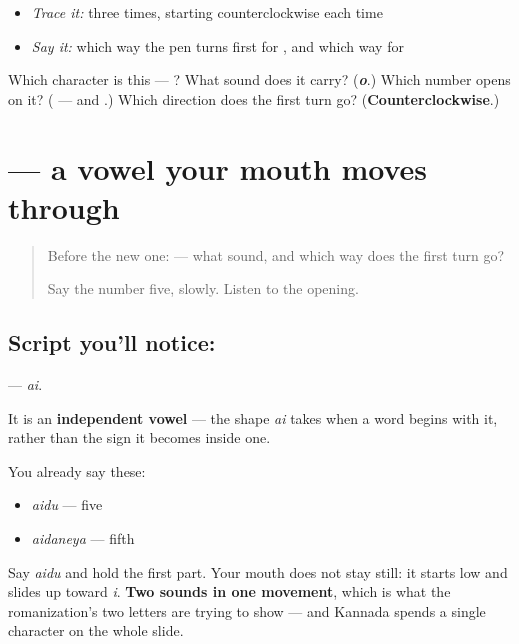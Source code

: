 \begin{itemize}
\raggedright
  \item \emph{Trace it:}  three times, starting counterclockwise each time
  \item \emph{Say it:} which way the pen turns first for , and which way for 
\end{itemize}

\begin{tcolorbox}[breakable,colback=teal!4,colframe=teal!35!black,title={Before you move on}]
Which character is this — ? What sound does it carry? (\emph{\textbf{o}}.) Which number opens on it? (\textbf{} — and \textbf{}.) Which direction does the first turn go? (\textbf{Counterclockwise}.)
\end{tcolorbox}
\section[\texorpdfstring{\kn{ಐ} (ai)}{ಐ (ai)}]{ — a vowel your mouth moves through}

\label{lesson:KA-S159-letter-ai}



\begin{quote}
Before the new one:  — what sound, and which way does the first turn go?

Say the number five, slowly. Listen to the opening.
\end{quote}

\subsection*{Script you'll notice: }
\textbf{} — \emph{ai}.

It is an \textbf{independent vowel} — the shape \emph{ai} takes when a word begins with it, rather than the sign it becomes inside one.

You already say these:

\begin{itemize}
\raggedright
  \item \textbf{} \emph{aidu} — five
  \item \textbf{} \emph{aidaneya} — fifth
\end{itemize}

Say \emph{aidu} and hold the first part. Your mouth does not stay still: it starts low and slides up toward \emph{i}. \textbf{Two sounds in one movement}, which is what the romanization's two letters are trying to show — and Kannada spends a single character on the whole slide.

